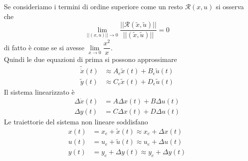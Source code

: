 \documentclass{article}
\begin{document}
Se consideriamo i termini di ordine superiore come un resto $\mathcal{R}(x,u)$ si osserva che
\[
    \lim_{||(x,u)||\rightarrow 0} \frac{||\mathcal{R}(\tilde{x},\tilde{u})||}{||(\tilde{x},\tilde{u})||} = 0
\]
di fatto è come se si avesse $\lim\limits_{x \rightarrow 0}\dfrac{x^2}{x}$.\\
Quindi le due equazioni di prima si possono approssimare
\begin{align*}
    \tilde{\dot x}(t) &\approx A_e \tilde{x}(t) + B_e \tilde{u}(t)\\
    \tilde{y}(t) &\approx C_e \tilde{x}(t) + D_e\tilde{u}(t) 
\end{align*}
Il sistema linearizzato è
\begin{align*}
    \Delta \dot x(t) &= A \Delta x(t) + B \Delta u(t)\\
    \Delta y(t) &= C \Delta x(t) + D \Delta u(t)
\end{align*} 
Le traiettorie del sistema non lineare soddisfano
\begin{align*}
    x(t) &= x_e + \tilde{x}(t) \approx x_e + \Delta x(t)\\
    u(t) &= u_e + \tilde{u}(t) \approx u_e + \Delta u(t)\\
    y(t) &= y_e + \Delta y(t) \approx y_e + \Delta y(t) 
\end{align*}
\end{document}
